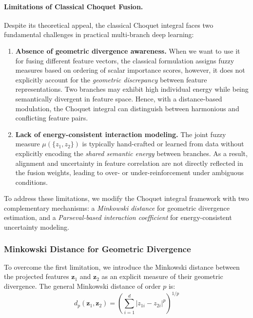 \documentclass[preprint,12pt]{elsarticle}
\begin{document}
\paragraph{Limitations of Classical Choquet Fusion.}
Despite its theoretical appeal, the classical Choquet integral faces two fundamental challenges in practical multi-branch deep learning:

\begin{enumerate}
    \item \textbf{Absence of geometric divergence awareness.} When we want to use it for fusing different feature vectors, the classical formulation assigns fuzzy measures based on ordering of scalar importance scores, however, it does not explicitly account for the \emph{geometric discrepancy} between feature representations. Two branches may exhibit high individual energy  while being semantically divergent in feature space. Hence, with a distance-based modulation, the Choquet integral can distinguish between harmonious and conflicting feature pairs.

    \item \textbf{Lack of energy-consistent interaction modeling.} The joint fuzzy measure $\mu(\{z_1, z_2\})$ is typically hand-crafted or learned from data without explicitly encoding the \emph{shared semantic energy} between branches. As a result, alignment and uncertainty in feature correlation are not directly reflected in the fusion weights, leading to over- or under-reinforcement under ambiguous conditions.
\end{enumerate}

To address these limitations, we modify the Choquet integral framework with two complementary mechanisms: a \textit{Minkowski distance} for geometric divergence estimation, and a \textit{Parseval-based interaction coefficient} for energy-consistent uncertainty modeling. 

\subsubsection{Minkowski Distance for Geometric Divergence}

To overcome the first limitation, we introduce the Minkowski distance between the projected features $\mathbf{z}_1$ and $\mathbf{z}_2$ as an explicit measure of their geometric divergence. The general Minkowski distance of order $p$ is:
\begin{equation*}
    d_p(\mathbf{z}_1, \mathbf{z}_2) = \left( \sum_{i=1}^{d} |z_{1i} - z_{2i}|^p \right)^{1/p}
\end{equation*}
\end{document}
